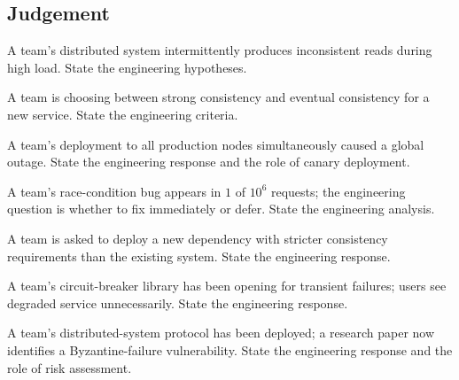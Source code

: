 \subsection*{Judgement}

\begin{exercise}
A team's distributed system intermittently produces inconsistent reads during high load. State the engineering hypotheses.
\end{exercise}

\begin{exercise}
A team is choosing between strong consistency and eventual consistency for a new service. State the engineering criteria.
\end{exercise}

\begin{exercise}
A team's deployment to all production nodes simultaneously caused a global outage. State the engineering response and the role of canary deployment.
\end{exercise}

\begin{exercise}
A team's race-condition bug appears in $1$ of $10^6$ requests; the engineering question is whether to fix immediately or defer. State the engineering analysis.
\end{exercise}

\begin{exercise}
A team is asked to deploy a new dependency with stricter consistency requirements than the existing system. State the engineering response.
\end{exercise}

\begin{exercise}
A team's circuit-breaker library has been opening for transient failures; users see degraded service unnecessarily. State the engineering response.
\end{exercise}

\begin{exercise}
A team's distributed-system protocol has been deployed; a research paper now identifies a Byzantine-failure vulnerability. State the engineering response and the role of risk assessment.
\end{exercise}
